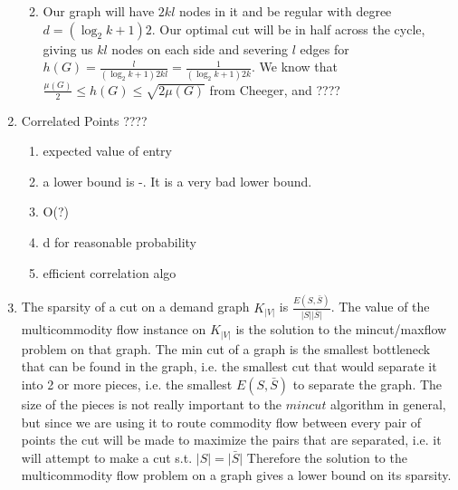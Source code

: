 \documentclass[a4paper]{article}
\begin{document}
\begin{enumerate}
\begin{enumerate}
\begin{enumerate}
			\end{enumerate}
		\item Our graph will have $2kl$ nodes in it and be regular with degree $d = (\log_2{k} +1)2$.  Our optimal cut will be in half across the cycle, giving us $kl$ nodes on each side and severing $l$ edges for $h(G) = \frac{l}{(\log_2{k} +1)2kl} = \frac{1}{(\log_2{k} +1)2k}$.  We know that $\frac{\mu(G)}{2} \leq h(G) \leq \sqrt{2\mu(G)}$ from Cheeger, and ????
	\end{enumerate}
\item Correlated Points ????
	\begin{enumerate}
		\item expected value of entry
		\item a lower bound is -\inf .  It is a very bad lower bound.
		\item O(?)
		\item d for reasonable probability
		\item efficient correlation algo
	\end{enumerate}
\item The sparsity of a cut on a demand graph $K_{\lvert V \rvert}$ is $\frac{E(S,\bar{S})}{\lvert S \rvert \lvert \bar{S}\rvert}$.  The value of the multicommodity flow instance on $K_{\lvert V \rvert}$ is the solution to the mincut/maxflow problem on that graph.  The min cut of a graph is the smallest bottleneck that can be found in the graph, i.e. the smallest cut that would separate it into 2 or more pieces, i.e. the smallest $E(S, \bar{S})$ to separate the graph.  The size of the pieces is not really important to the $mincut$ algorithm in general, but since we are using it to route commodity flow between every pair of points the cut will be made to maximize the pairs that are separated, i.e. it will attempt to make a cut s.t. $\lvert S \rvert = \lvert \bar{S}\rvert$  Therefore the solution to the multicommodity flow problem on a graph gives a lower bound on its sparsity.
\end{enumerate}
\end{document}
